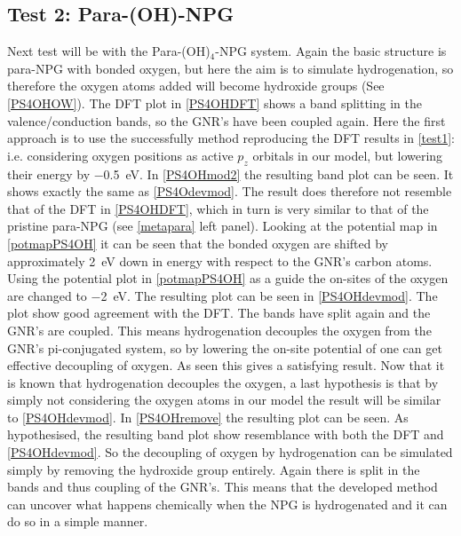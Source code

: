 \subsection{Test 2: Para-(OH)-NPG}\label{test2}
Next test will be with the Para-(OH)\(_4\)-NPG system. Again the basic structure is para-NPG with bonded oxygen, but here the aim is to simulate hydrogenation, so therefore the oxygen atoms added will become hydroxide groups (See \cref{PS4OHOW}). The DFT plot in \cref{PS4OHDFT} shows a band splitting in the valence/conduction bands, so the GNR's have been coupled again. Here the first approach is to use the successfully method reproducing the DFT results in \cref{test1}: i.e. considering oxygen positions as active \(p_z\) orbitals in our model, but lowering their energy by \SI{-0.5}{\electronvolt}. In \cref{PS4OHmod2} the resulting band plot can be seen. It shows exactly the same as \cref{PS4Odevmod}. The result does therefore not resemble that of the DFT in \cref{PS4OHDFT}, which in turn is very similar to that of the pristine para-NPG (see \cref{metapara} left panel). Looking at the potential map in \cref{potmapPS4OH} it can be seen that the bonded oxygen are shifted by approximately \SI{2}{\electronvolt} down in energy with respect to the GNR's carbon atoms. Using the potential plot in \cref{potmapPS4OH} as a guide the on-sites of the oxygen are changed to \SI{-2}{\electronvolt}. The resulting plot can be seen in \cref{PS4OHdevmod}. The plot show good agreement with the DFT. The bands have split again and the GNR's are coupled. This means hydrogenation decouples the oxygen from the GNR's pi-conjugated system, so by lowering the on-site potential of one can get effective decoupling of oxygen. As seen this gives a satisfying result. Now that it is known that hydrogenation decouples the oxygen, a last hypothesis is that by simply not considering the oxygen atoms in our model the result will be similar to \cref{PS4OHdevmod}. In \cref{PS4OHremove} the resulting plot can be seen. As hypothesised, the resulting band plot show resemblance with both the DFT and \cref{PS4OHdevmod}. So the decoupling of oxygen by hydrogenation can be simulated simply by removing the hydroxide group entirely. Again there is split in the bands and thus coupling of the GNR's. This means that the developed method can uncover what happens chemically when the NPG is hydrogenated and it can do so in a simple manner.
